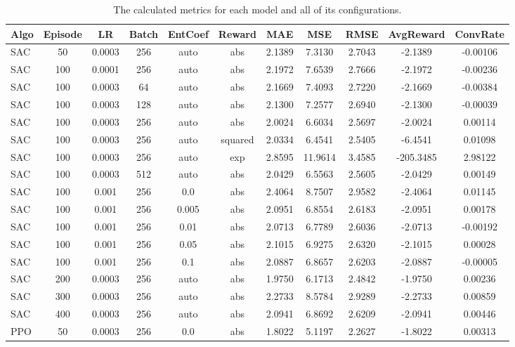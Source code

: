 \documentclass[11pt]{article}
\begin{document}
\begin{table}[h!]
\scriptsize
\centering
\caption{The calculated metrics for each model and all of its configurations.}
\begin{tabular}{|lccccc|ccccc|}
\hline
\textbf{Algo} & \textbf{Episode} & \textbf{LR} & \textbf{Batch} & \textbf{EntCoef} & \textbf{Reward} & \textbf{MAE} & \textbf{MSE} & \textbf{RMSE} & \textbf{AvgReward} & \textbf{ConvRate} \\
\hline
SAC & 50  & 0.0003 & 256 & auto & abs & 2.1389 & 7.3130 & 2.7043 & -2.1389 & -0.00106 \\
SAC & 100 & 0.0001 & 256 & auto & abs & 2.1972 & 7.6539 & 2.7666 & -2.1972 & -0.00236 \\
SAC & 100 & 0.0003 & 64  & auto & abs & 2.1669 & 7.4093 & 2.7220 & -2.1669 & -0.00384 \\
SAC & 100 & 0.0003 & 128 & auto & abs & 2.1300 & 7.2577 & 2.6940 & -2.1300 & -0.00039 \\
SAC & 100 & 0.0003 & 256 & auto & abs & 2.0024 & 6.6034 & 2.5697 & -2.0024 &  0.00114 \\
SAC & 100 & 0.0003 & 256 & auto & squared & 2.0334 & 6.4541 & 2.5405 & -6.4541 & 0.01098 \\
SAC & 100 & 0.0003 & 256 & auto & exp & 2.8595 & 11.9614 & 3.4585 & -205.3485 & 2.98122 \\
SAC & 100 & 0.0003 & 512 & auto & abs & 2.0429 & 6.5563 & 2.5605 & -2.0429 &  0.00149 \\
SAC & 100 & 0.001  & 256 & 0.0  & abs & 2.4064 & 8.7507 & 2.9582 & -2.4064 &  0.01145 \\
SAC & 100 & 0.001  & 256 & 0.005 & abs & 2.0951 & 6.8554 & 2.6183 & -2.0951 &  0.00178 \\
SAC & 100 & 0.001  & 256 & 0.01  & abs & 2.0713 & 6.7789 & 2.6036 & -2.0713 & -0.00192 \\
SAC & 100 & 0.001  & 256 & 0.05  & abs & 2.1015 & 6.9275 & 2.6320 & -2.1015 &  0.00028 \\
SAC & 100 & 0.001  & 256 & 0.1   & abs & 2.0887 & 6.8657 & 2.6203 & -2.0887 & -0.00005 \\
SAC & 200 & 0.0003 & 256 & auto & abs & 1.9750 & 6.1713 & 2.4842 & -1.9750 &  0.00236 \\
SAC & 300 & 0.0003 & 256 & auto & abs & 2.2733 & 8.5784 & 2.9289 & -2.2733 &  0.00859 \\
SAC & 400 & 0.0003 & 256 & auto & abs & 2.0941 & 6.8692 & 2.6209 & -2.0941 &  0.00446 \\
PPO & 50  & 0.0003 & 256 & 0.0  & abs & 1.8022 & 5.1197 & 2.2627 & -1.8022 &  0.00313 \\

\end{tabular}
\end{table}
\end{document}
